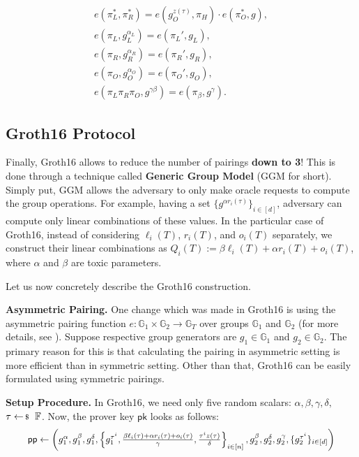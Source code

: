 \documentclass[../../book.tex]{subfiles}
\begin{document}
\begin{tcolorbox}
\begin{itemize}[label=]
    \end{itemize}
    \begin{align*}
        e(\pi_L^*, \pi_R^*) = e(g_O^{z(\tau)}, \pi_H)\cdot e(\pi_O^*, g), \\
        e(\pi_L, g_L^{\alpha_L}) = e(\pi_L', g_L), \\
        e(\pi_R, g_R^{\alpha_R}) = e(\pi_R', g_R), \\
        e(\pi_O, g_O^{\alpha_O}) = e(\pi_O', g_O), \\
        e(\pi_L\pi_R\pi_O, g^{\gamma\beta}) = e(\pi_{\beta}, g^{\gamma}).
    \end{align*}
\end{tcolorbox}

\subsection{Groth16 Protocol}

Finally, Groth16 \cite{groth16} allows to reduce the number of pairings \textbf{down to 3}! This is done through a technique called \textbf{Generic Group Model} (GGM for short). Simply put, GGM allows the adversary to only make oracle requests to compute the group operations. For example, having a set $\{g^{\alpha r_i(\tau)}\}_{i \in [d]}$, adversary can compute only linear combinations of these values. In the particular case of Groth16, instead of considering $\ell_i(T)$, $r_i(T)$, and $o_i(T)$ separately, we construct their linear combinations as $Q_i(T) := \beta \ell_i(T) + \alpha r_i(T) + o_i(T)$, where $\alpha$ and $\beta$ are toxic parameters.

Let us now concretely describe the Groth16 construction.

\textcolor{gray!75!black}{\textbf{Asymmetric Pairing.}} One change which was made in Groth16 is using the asymmetric pairing function $e: \mathbb{G}_1 \times \mathbb{G}_2 \to \mathbb{G}_T$ over groups $\mathbb{G}_1$ and $\mathbb{G}_2$ (for more details, see ). Suppose respective group generators are $g_1 \in \mathbb{G}_1$ and $g_2 \in \mathbb{G}_2$. The primary reason for this is that calculating the pairing in asymmetric setting is more efficient than in symmetric setting. Other than that, Groth16 can be easily formulated using symmetric pairings.

\textcolor{blue!75!gray}{\textbf{Setup Procedure.}} In Groth16, we need only five random scalars: $\alpha,\beta,\gamma,\delta,$ \\ $\tau \leftarrowS \mathbb{F}$. Now, the prover key $\mathsf{pk}$ looks as follows:
\begin{equation*}
    \scalebox{0.95}{$
        \mathsf{pp} \gets \left(g_1^{\alpha},g_1^{\beta},g_1^{\delta},\left\{g_1^{\tau^i},\frac{\beta \ell_i(\tau) + \alpha r_i(\tau) + o_i(\tau)}{\gamma}, \frac{\tau^i z(\tau)}{\delta}\right\}_{i \in [n]},g_2^{\beta}, g_2^{\delta}, g_2^{\gamma}, \{g_2^{\tau^i}\}_{i \in [d]}\right)
    $}
\end{equation*}
\end{document}
